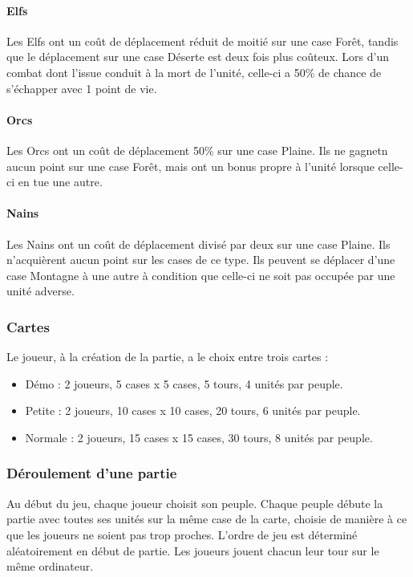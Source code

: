 \documentclass[a4paper]{article}
\begin{document}
\paragraph{Elfs} Les Elfs ont un coût de déplacement réduit de moitié sur une case Forêt, tandis que le déplacement sur une case Déserte est deux fois plus coûteux. Lors d'un combat dont l'issue conduit à la mort de l'unité, celle-ci a 50\% de chance de s'échapper avec 1 point de vie.
\paragraph{Orcs} Les Orcs ont un coût de déplacement 50\% sur une case Plaine. Ils ne gagnetn aucun point sur une case Forêt, mais ont un bonus propre à l'unité lorsque celle-ci en tue une autre.
\paragraph{Nains} Les Nains ont un coût de déplacement divisé par deux sur une case Plaine. Ils n'acquièrent aucun point sur les cases de ce type. Ils peuvent se déplacer d'une case Montagne à une autre à condition que celle-ci ne soit pas occupée par une unité adverse.

\subsubsection{Cartes}
Le joueur, à la création de la partie, a le choix entre trois cartes :
\begin{itemize}
\item Démo : 2 joueurs, 5 cases x 5 cases, 5 tours, 4 unités par peuple.
\item Petite : 2 joueurs, 10 cases x 10 cases, 20 tours, 6 unités par peuple.
\item Normale : 2 joueurs, 15 cases x 15 cases, 30 tours, 8 unités par peuple.
\end{itemize}

\subsubsection{Déroulement d'une partie}
Au début du jeu, chaque joueur choisit son peuple. Chaque peuple débute la partie avec toutes ses unités sur la même case de la carte, choisie de manière à ce que les joueurs ne soient pas trop proches. L’ordre de jeu est déterminé aléatoirement en début de partie. Les joueurs jouent chacun leur tour sur le même ordinateur.
\end{document}

